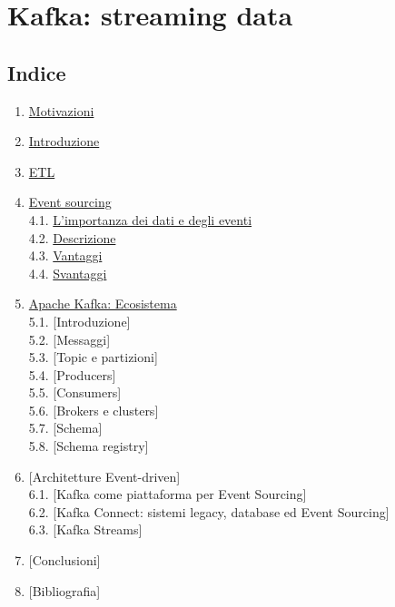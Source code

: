 \documentclass[]{article}
\date{}
\providecommand{\tightlist}{%
  \setlength{\itemsep}{0pt}\setlength{\parskip}{0pt}}
\begin{document}
\section{Kafka: streaming data}\label{kafka-streaming-data}

\subsection{Indice}\label{indice}

\begin{enumerate}
\def\labelenumi{\arabic{enumi}.}
\tightlist
\item
  \protect\hyperlink{motivazioni}{Motivazioni}
\item
  \protect\hyperlink{introduzione}{Introduzione}
\item
  \protect\hyperlink{etl}{ETL}
\item
  \protect\hyperlink{event-sourcing}{Event sourcing}\\
  4.1. \protect\hyperlink{intro-data}{L'importanza dei dati e degli
  eventi}\\
  4.2. \protect\hyperlink{es-desc}{Descrizione}\\
  4.3. \protect\hyperlink{es-vantaggi}{Vantaggi}\\
  4.4. \protect\hyperlink{es-svantaggi}{Svantaggi}
\item
  \protect\hyperlink{kafka-desc}{Apache Kafka: Ecosistema}\\
  5.1. {[}Introduzione{]}\\
  5.2. {[}Messaggi{]}\\
  5.3. {[}Topic e partizioni{]}\\
  5.4. {[}Producers{]}\\
  5.5. {[}Consumers{]}\\
  5.6. {[}Brokers e clusters{]}\\
  5.7. {[}Schema{]}\\
  5.8. {[}Schema registry{]}
\item
  {[}Architetture Event-driven{]}\\
  6.1. {[}Kafka come piattaforma per Event Sourcing{]}\\
  6.2. {[}Kafka Connect: sistemi legacy, database ed Event Sourcing{]}\\
  6.3. {[}Kafka Streams{]}
\item
  {[}Conclusioni{]}
\item
  {[}Bibliografia{]}
\end{enumerate}

\newpage
\end{document}
